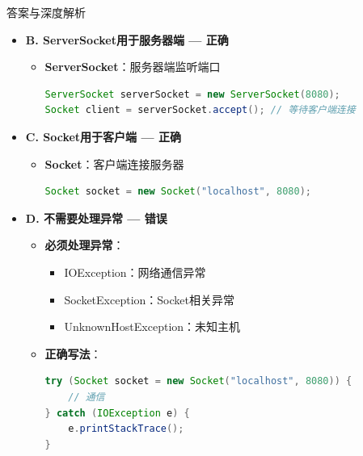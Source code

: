 \documentclass[12pt, a4paper]{ctexart}
\begin{document}
\begin{enumerate}[label=\textbf{\arabic*.}]
\begin{bluebox}{答案与深度解析}
\begin{itemize}[label={}, leftmargin=*, nosep]
		      \item \textbf{B. ServerSocket用于服务器端 — 正确}
		      \begin{itemize}[label={}, leftmargin=*, nosep]
			      \item \textbf{ServerSocket}：服务器端监听端口
			            \begin{lstlisting}[language=Java]
ServerSocket serverSocket = new ServerSocket(8080);
Socket client = serverSocket.accept(); // 等待客户端连接
      \end{lstlisting}
		      \end{itemize}

		      \item \textbf{C. Socket用于客户端 — 正确}
		      \begin{itemize}[label={}, leftmargin=*, nosep]
			      \item \textbf{Socket}：客户端连接服务器
			            \begin{lstlisting}[language=Java]
Socket socket = new Socket("localhost", 8080);
      \end{lstlisting}
		      \end{itemize}

		      \item \textbf{D. 不需要处理异常 — 错误}
		      \begin{itemize}[label={}, leftmargin=*, nosep]
			      \item \textbf{必须处理异常}：
			            \begin{itemize}[label={}, nosep]
				            \item IOException：网络通信异常
				            \item SocketException：Socket相关异常
				            \item UnknownHostException：未知主机
			            \end{itemize}
			      \item \textbf{正确写法}：
			            \begin{lstlisting}[language=Java]
try (Socket socket = new Socket("localhost", 8080)) {
    // 通信
} catch (IOException e) {
    e.printStackTrace();
}
      \end{lstlisting}
		      \end{itemize}

		      \end{itemize}


\end{bluebox}
\end{enumerate}
\end{document}

